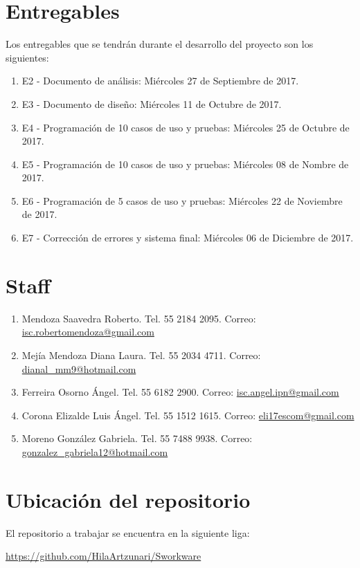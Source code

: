 \section{Entregables}

Los entregables que se tendrán durante el desarrollo del proyecto son los siguientes:

\begin{enumerate}
	\item E2 - Documento de análisis: Miércoles 27 de Septiembre de 2017.
	\item E3 - Documento de diseño: Miércoles 11 de Octubre de 2017.
	\item E4 - Programación de 10 casos de uso y pruebas: Miércoles 25 de Octubre de 2017.
	\item E5 - Programación de 10 casos de uso y pruebas: Miércoles 08 de Nombre de 2017.
	\item E6 - Programación de 5 casos de uso y pruebas: Miércoles 22 de Noviembre de 2017.
	\item E7 - Corrección de errores y sistema final: Miércoles 06 de Diciembre de 2017.
\end{enumerate}

\section{Staff}

\begin{enumerate}
	\item Mendoza Saavedra Roberto. Tel. 55 2184 2095. Correo: \href{isc.robertomendoza@gmail.com}{isc.robertomendoza@gmail.com}
	\item Mejía Mendoza Diana Laura. Tel. 55 2034 4711. Correo: \href{dianal_mm9@hotmail.com}{dianal\_mm9@hotmail.com}
	\item Ferreira Osorno Ángel. Tel. 55 6182 2900. Correo: \href{isc.angel.ipn@gmail.com}{isc.angel.ipn@gmail.com}
	\item Corona Elizalde Luis Ángel. Tel. 55 1512 1615. Correo: \href{eli17escom@gmail.com}{eli17escom@gmail.com}
	\item Moreno González Gabriela. Tel. 55 7488 9938. Correo: \href{gonzalez_gabriela12@hotmail.com}{gonzalez\_gabriela12@hotmail.com}
\end{enumerate}

\section{Ubicación del repositorio}
El repositorio a trabajar se encuentra en la siguiente liga:

\href{https://github.com/HilaArtzunari/Sworkware}{https://github.com/HilaArtzunari/Sworkware}